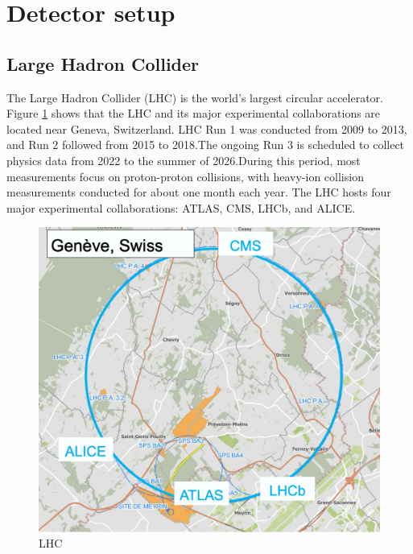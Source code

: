 \newpage
\clearpage
\section{Detector setup}
    \subsection{Large Hadron Collider}
        The Large Hadron Collider (LHC) is the world's largest circular accelerator. Figure \ref{LHC} shows that the LHC and its major experimental collaborations are located near Geneva, Switzerland. LHC Run 1 was conducted from 2009 to 2013, and Run 2 followed from 2015 to 2018.\@ The ongoing Run 3 is scheduled to collect physics data from 2022 to the summer of 2026.\@ During this period, most measurements focus on proton-proton collisions, with heavy-ion collision measurements conducted for about one month each year. The LHC hosts four major experimental collaborations: ATLAS, CMS, LHCb, and ALICE.\@
        \begin{figure}[htbp]
            \centering
            \includegraphics[keepaspectratio, scale=0.2]{fig/2_1_LHC_detecter.png}
            \caption{LHC}
            \label{LHC}
        \end{figure}
